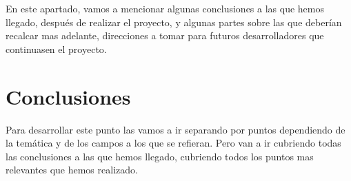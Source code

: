 

En este apartado, vamos a mencionar algunas conclusiones a las que hemos llegado, después de realizar el proyecto, y algunas partes sobre las que deberían recalcar mas adelante, direcciones a tomar para futuros desarrolladores que continuasen el proyecto.



\section{Conclusiones}
Para desarrollar este punto las vamos a ir separando por puntos dependiendo de la temática y de los campos a los que se refieran.
Pero van a ir cubriendo todas las conclusiones a las que hemos llegado, cubriendo todos los puntos mas relevantes que hemos realizado.

